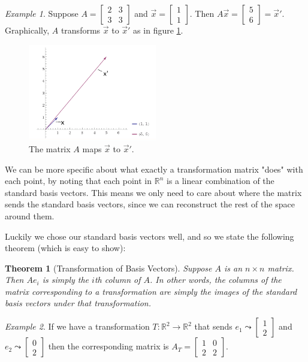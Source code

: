 \documentclass[10pt, a4paper]{amsart}
\newtheorem{thm}{Theorem}
\theoremstyle{definition}
\theoremstyle{remark}
\newtheorem{ex}{Example}
\begin{document}
\begin{ex}
  Suppose $ A = \begin{bmatrix} 2 & 3 \\ 3 & 3 \end{bmatrix} $ and $ \vec{x} = \begin{bmatrix} 1 \\ 1 \end{bmatrix} $.
  Then $ A\vec{x} = \begin{bmatrix} 5 \\ 6 \end{bmatrix} = \vec{x}' $. Graphically, $ A $ transforms $ \vec{x} $
  to $ \vec{x}' $ as in figure \ref{fig:FirstMatrixTransform}.

  \begin{figure}
    \includegraphics[width=0.5\textwidth]{mtransform1}
    \caption{The matrix $ A $ maps $ \vec{x} $ to $ \vec{x}' $.}
    \label{fig:FirstMatrixTransform}
  \end{figure}
\end{ex}

We can be more specific about what exactly a transformation matrix "does" with each point,
by noting that each point in $ \mathbb{R}^n $ is a linear combination of the standard basis
vectors. This means we only need to care about where the matrix sends the standard basis
vectors, since we can reconstruct the rest of the space around them.

Luckily we chose our standard basis vectors well, and so we state the following theorem
(which is easy to show):

\begin{thm}[Transformation of Basis Vectors]
  Suppose $ A $ is an $ n \times n $ matrix. Then $ A e_i $ is simply the $ i$th
  column of $ A $. In other words, the columns of the matrix corresponding to a transformation
  are simply the images of the standard basis vectors under that transformation.
\end{thm}

\begin{ex}
  If we have a transformation $ T : \mathbb{R}^2 \rightarrow \mathbb{R}^2 $ that sends $ e_1 \leadsto \begin{bmatrix} 1 \\ 2 \end{bmatrix} $
  and $ e_2 \leadsto \begin{bmatrix} 0 \\ 2 \end{bmatrix} $ then the corresponding matrix is $ A_T = \begin{bmatrix} 1 & 0 \\ 2 & 2 \end{bmatrix} $.
\end{ex}
\end{document}
